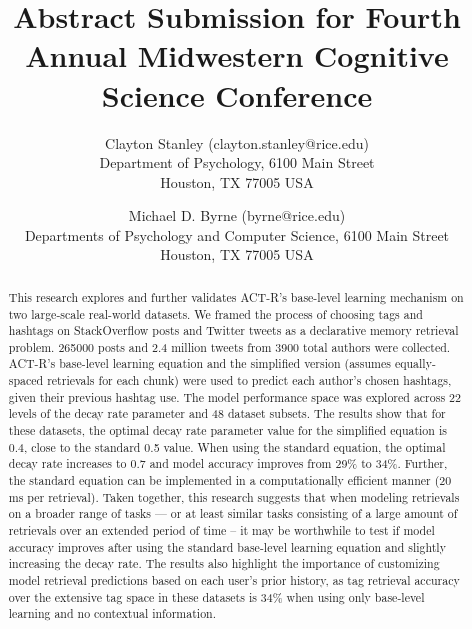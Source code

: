 \documentclass[english]{article}
\title{Abstract Submission for Fourth Annual Midwestern Cognitive Science Conference}
\author{Clayton Stanley (clayton.stanley@rice.edu) \\
  Department of Psychology, 6100 Main Street \\
  Houston, TX 77005 USA 
  \and Michael D. Byrne (byrne@rice.edu) \\
  Departments of Psychology and Computer Science, 6100 Main Street \\
  Houston, TX 77005 USA \\
}
\begin{document}
\maketitle

\begin{abstract}
  This research explores and further validates ACT-R's base-level learning mechanism on two large-scale real-world datasets.
  We framed the process of choosing tags and hashtags on StackOverflow posts and Twitter tweets as a declarative memory retrieval problem.
  \num{265000} posts and 2.4 million tweets from \num{3900} total authors were collected. 
  ACT-R's base-level learning equation and the simplified version (assumes equally-spaced retrievals for each chunk) were used to predict each author's chosen hashtags, given their previous hashtag use.
  The model performance space was explored across 22 levels of the decay rate parameter and 48 dataset subsets.
  The results show that for these datasets, the optimal decay rate parameter value for the simplified equation is 0.4, close to the standard 0.5 value. 
  When using the standard equation, the optimal decay rate increases to 0.7 and model accuracy improves from 29\% to 34\%. 
  Further, the standard equation can be implemented in a computationally efficient manner (20 ms per retrieval).
  Taken together, this research suggests that when modeling retrievals on a broader range of tasks --- or at least similar tasks consisting of a large amount of retrievals over an extended period of time --
  it may be worthwhile to test if model accuracy improves after using the standard base-level learning equation and slightly increasing the decay rate.
  The results also highlight the importance of customizing model retrieval predictions based on each user's prior history,
  as tag retrieval accuracy over the extensive tag space in these datasets is 34\% when using only base-level learning and no contextual information.
\end{abstract}
\end{document}

